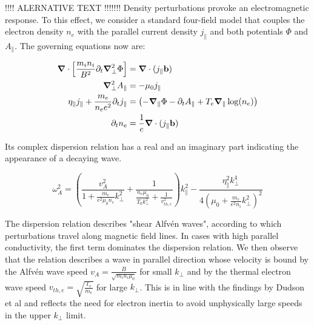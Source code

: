 !!!! ALERNATIVE TEXT !!!!!!!
Density perturbations provoke an electromagnetic response. To this effect, we consider a standard four-field model that couples the electron density $n_e$ with the parallel current density $j_\parallel$ and both potentials $\Phi$ and $A_\parallel$. The governing equations now are: 

\begin{align}
	\grad\cdot\left[\frac{m_i n_i}{ B^2}\partial_t\grad^2_\perp\Phi\right] &= \grad\cdot(j_\parallel\mathbf{b}) \\
	\grad^2_\perp A_\parallel &= -\mu_0j_\parallel \\
	\eta_\parallel j_\parallel + \frac{ m_e}{n_ee^2} \partial_t j_\parallel  &= \left(-\grad_\parallel\Phi - \partial_t A_\parallel + T_e\grad_\parallel\log(n_e)\right) \\
	\partial_t n_e &= \frac{1}{e}\grad\cdot (j_\parallel\mathbf{b}) 
	\label{eq:fourFieldModel}
\end{align}

Its complex dispersion relation has a real and an imaginary part indicating the appearance of a decaying wave. 

\begin{equation}
	\label{eq:dispersionRelation}
	\omega_A^2 = \left(\frac{v_A^2}{1 + \frac{m_e}{e^2 \mu_0 n_e} k_\perp^2} + \frac{1}{\frac{n_e \mu_0}{T_0 k_\perp^2} + \frac{1}{v_{th,e}^2}}\right) k_\parallel^2 - \frac{\eta_\parallel^2k_\perp^4}{4\left(\mu_0+\frac{m_e}{e^2n_i}k_\perp^2\right)^2}
\end{equation}

The dispersion relation describes "shear Alfvén waves", according to which perturbations travel along magnetic field lines. In cases with high parallel conductivity, the first term dominates the dispersion relation. We then observe that the relation describes a wave in parallel direction whose velocity is bound by the Alfvén wave speed $v_A = \frac{B}{\sqrt{m_in_i\mu_0}}$ for small $k_\perp$ and by the thermal electron wave speed $v_ {th,e} = \sqrt{\frac{T_e}{m_e}}$ for large $k_\perp$. This is in line with the findings by Dudson et al \cite{Dudson2021} and reflects the need for electron inertia to avoid unphysically large speeds in the upper $k_\perp$ limit.


